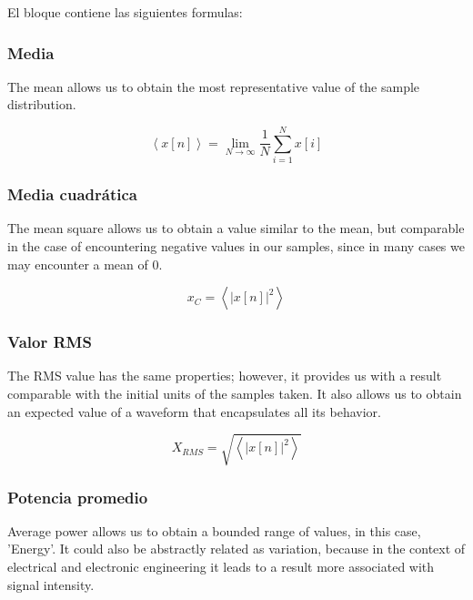 \documentclass{journal}[IEEEtran, twocolumn]             %
\begin{document}
\begin{multicols}{2}
El bloque contiene las siguientes formulas:

\subsubsection{Media}

 The mean allows us to obtain the most representative value of the sample distribution.

\begin{equation*}
\left \langle x[n] \right \rangle = \lim_{N\rightarrow \infty }\frac{1}{N}\sum_{i = 1}^{N}x[i]
\end{equation*}

\subsubsection{Media cuadrática}

The mean square allows us to obtain a value similar to the mean, but comparable in the case of encountering negative values in our samples, since in many cases we may encounter a mean of 0.

\begin{equation*}
    x_{C} = \left \langle |x[n]|^{2} \right \rangle
\end{equation*}

\subsubsection{Valor RMS}

The RMS value has the same properties; however, it provides us with a result comparable with the initial units of the samples taken. It also allows us to obtain an expected value of a waveform that encapsulates all its behavior.

\begin{equation*}
    X_{RMS} = \sqrt{\left \langle |x[n]|^{2} \right \rangle}
\end{equation*}

\subsubsection{Potencia promedio}

Average power allows us to obtain a bounded range of values, in this case, 'Energy'. It could also be abstractly related as variation, because in the context of electrical and electronic engineering it leads to a result more associated with signal intensity.


\end{multicols}
\end{document}

